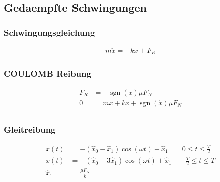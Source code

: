 \subsection{Gedaempfte Schwingungen}

\begin{multicols}{2}{}
\subsubsection*{Schwingungsgleichung}
\begin{align*}
m\ddot{x}=-kx+F_R
\end{align*}
\hfill

\subsubsection*{COULOMB Reibung}
\begin{align*}
F_R&=-\operatorname{sgn}({\dot{x}})\mu F_N\\
0&=m\ddot{x}+kx+\operatorname{sgn}({\dot{x}})\mu F_N\\
\end{align*}
\end{multicols}


\subsubsection*{Gleitreibung}
\begin{align*}
x(t)&=-(\hat{x}_0-\hat{x}_1)\cos(\omega t)-\hat{x}_1\qquad 0\leq t\leq \frac{T}{2}\\
x(t)&=-(\hat{x}_0-3\hat{x}_1)\cos(\omega t)+\hat{x}_1\qquad \frac{T}{2}\leq t\leq T\\
\hat{x}_1&=\frac{\mu F_N}{k}
\end{align*}


